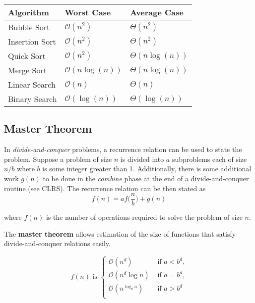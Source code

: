 \begin{table}[H]
	\centering
	\begin{tabular}{@{}lll@{}}
	\toprule
	\textbf{Algorithm}  & \textbf{Worst Case}  & \textbf{Average Case} \\ \midrule
	Bubble Sort & \( \mathcal{O}(n^2) \) & \( \Theta(n^2) \) \\
	Insertion Sort & \( \mathcal{O}(n^2) \) & \( \Theta(n^2) \) \\
	Quick Sort & \( \mathcal{O}(n^2) \) & \( \Theta(n \log(n)) \) \\
	Merge Sort & \( \mathcal{O}(n \log(n)) \) & \( \Theta(n \log(n)) \) \\
	Linear Search & \( \mathcal{O}(n) \) & \( \Theta(n) \) \\
	Binary Search &\( \mathcal{O}(\log(n)) \) & \( \Theta(\log(n)) \) \\
	\bottomrule
	\end{tabular}
	\end{table}

\subsection{Master Theorem}
In \emph{divide-and-conquer} problems, a recurrence relation can be used to state the problem. Suppose a problem of size \( n \) is divided into \( a \) subproblems each of size \( n/b \) where \( b \) is some integer greater than 1. Additionally, there is some additional work \( g(n) \) to be done in the \emph{combine} phase at the end of a divide-and-conquer routine (see CLRS). The recurrence relation can be then stated as \[
f(n) = af\big(\frac{n}{b}\big)+ g(n)
\]

where \( f(n) \) is the number of operations required to solve the problem of size \( n \).

The \textbf{master theorem} allows estimation of the size of functions that satisfy divide-and-conquer relations easily.

\begin{equation*}
	f(n) \text{ is } \begin{cases}
		\mathcal{O}(n^d) & \text{ if } a < b^d \text{,} \\
		\mathcal{O}(n^d \log n) & \text{ if } a = b^d \text{,} \\
		\mathcal{O}(n^{ \log_b a}) & \text{ if } a > b^d \\
	\end{cases}
\end{equation*}
